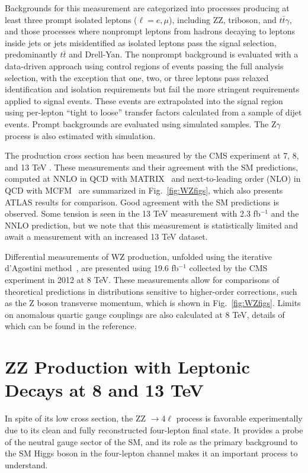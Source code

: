 \documentclass[10pt]{article}
\begin{document}
Backgrounds for this measurement are categorized into processes producing at least
three prompt isolated leptons ($\ell = e, \mu$), including ZZ, triboson, and 
$t\bar{t}\gamma$, and those processes where nonprompt
leptons from hadrons decaying to leptons inside jets or jets misidentified as isolated
leptons pass the signal selection, predominantly $t\bar{t}$ and Drell-Yan. 
The nonprompt background is evaluated with a data-driven approach using 
control regions of events passing the full analysis selection,
with the exception that one, two, or three leptons pass relaxed identification 
and isolation requirements but fail the more stringent requirements applied to signal events.
These events are extrapolated into the signal region using per-lepton 
``tight to loose'' transfer factors
calculated from a sample of dijet events. Prompt backgrounds are evaluated using 
simulated samples. The Z$\gamma$ process is also estimated with simulation.


The production cross section has been measured by the CMS experiment at 7, 8, 
\cite{Khachatryan:2016poo}
and 13 TeV
\cite{Khachatryan:2016tgp}.
These measurements and their agreement with the SM
predictions, computed at NNLO in QCD with \textsc{MATRIX}~\cite{Grazzini:2016swo} and 
next-to-leading order (NLO) in 
QCD with \textsc{MCFM}~\cite{Campbell:2011bn}
are summarized in Fig.~\ref{fig:WZfigs}, which also presents ATLAS results for comparison. 
Good agreement with the SM predictions
is observed. Some tension is seen in the 13 TeV measurement with 2.3 fb$^{-1}$
and the NNLO prediction, but we note that this measurement is statistically
limited and await a measurement with an increased 13 TeV dataset.

Differential measurements of WZ production, unfolded using the 
iterative d'Agostini method~\cite{DAgostini:1994fjx}, are presented using 19.6 fb$^{-1}$
collected by the CMS experiment in 2012 at 8 TeV. These measurements allow for
comparisons of theoretical predictions in distributions sensitive 
to higher-order corrections, such as the Z boson transverse momentum, which is
shown in Fig.~\ref{fig:WZfigs}. Limits on anomalous quartic gauge couplings are
also calculated at 8 TeV, details of which can be found in the reference.


\section{ZZ Production with Leptonic Decays at 8 and 13 TeV}

In spite of its low cross section, the ZZ $\rightarrow 4\ell$ process 
is favorable experimentally due to its clean and fully reconstructed 
four-lepton final state. It provides a probe of the neutral gauge sector 
of the SM, and its role as the primary background to the SM Higgs
boson in the four-lepton channel makes it an important
process to understand.
\end{document}
